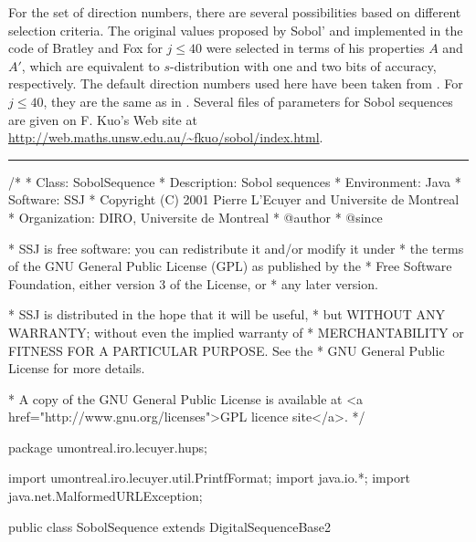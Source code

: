 For the set of direction numbers, there are several possibilities
based on different selection criteria.
The original values proposed by Sobol' and implemented in the code of
Bratley and Fox \cite{rBRA88c} for $j\le 40$ 
were selected in terms of his properties $A$ and $A'$, 
which are equivalent to $s$-distribution with one and 
two bits of accuracy, respectively.
The default direction numbers used here have been taken from 
.
For $j\le 40$, they are the same as in 
 .
Several files of parameters for Sobol sequences are given on F. Kuo's
Web site at \url{http://web.maths.unsw.edu.au/~fkuo/sobol/index.html}.
%


\bigskip\hrule\bigskip

\begin{code}
\begin{hide}
/*
 * Class:        SobolSequence
 * Description:  Sobol sequences
 * Environment:  Java
 * Software:     SSJ 
 * Copyright (C) 2001  Pierre L'Ecuyer and Universite de Montreal
 * Organization: DIRO, Universite de Montreal
 * @author       
 * @since

 * SSJ is free software: you can redistribute it and/or modify it under
 * the terms of the GNU General Public License (GPL) as published by the
 * Free Software Foundation, either version 3 of the License, or
 * any later version.

 * SSJ is distributed in the hope that it will be useful,
 * but WITHOUT ANY WARRANTY; without even the implied warranty of
 * MERCHANTABILITY or FITNESS FOR A PARTICULAR PURPOSE.  See the
 * GNU General Public License for more details.

 * A copy of the GNU General Public License is available at
   <a href="http://www.gnu.org/licenses">GPL licence site</a>.
 */
\end{hide}
package umontreal.iro.lecuyer.hups;\begin{hide}
import umontreal.iro.lecuyer.util.PrintfFormat;
import java.io.*;
import java.net.MalformedURLException;
\end{hide}

public class SobolSequence extends DigitalSequenceBase2 \begin{hide} { 

    // Maximal dimension for primitive polynomials included in this file
    protected static final int MAXDIM    = 360;
    protected static final int MAXDEGREE = 18;  // Of primitive polynomial
    private String filename = null;
\end{hide}
\end{code}

